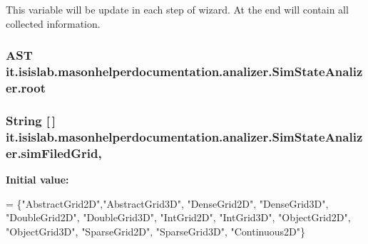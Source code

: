 This variable will be update in each step of wizard. At the end will contain all collected information. \hypertarget{classit_1_1isislab_1_1masonhelperdocumentation_1_1analizer_1_1_sim_state_analizer_acb0b59c4c3e5d2f326d75a95aaac7b5d}{
\subsubsection[{root}]{\setlength{\rightskip}{0pt plus 5cm}A\-S\-T it.\-isislab.\-masonhelperdocumentation.\-analizer.\-Sim\-State\-Analizer.\-root\hspace{0.3cm}{\ttfamily [private]}}}\label{classit_1_1isislab_1_1masonhelperdocumentation_1_1analizer_1_1_sim_state_analizer_acb0b59c4c3e5d2f326d75a95aaac7b5d}
\hypertarget{classit_1_1isislab_1_1masonhelperdocumentation_1_1analizer_1_1_sim_state_analizer_a558bb0807bb266f5ec5ef24c97b08c02}{
\subsubsection[{sim\-Filed\-Grid}]{\setlength{\rightskip}{0pt plus 5cm}String \mbox{[}$\,$\mbox{]} it.\-isislab.\-masonhelperdocumentation.\-analizer.\-Sim\-State\-Analizer.\-sim\-Filed\-Grid\hspace{0.3cm}{\ttfamily [static]}, {\ttfamily [private]}}}\label{classit_1_1isislab_1_1masonhelperdocumentation_1_1analizer_1_1_sim_state_analizer_a558bb0807bb266f5ec5ef24c97b08c02}
{\bfseries Initial value\-:}
\begin{DoxyCode}
= \{\textcolor{stringliteral}{"AbstractGrid2D"},\textcolor{stringliteral}{"AbstractGrid3D"}, \textcolor{stringliteral}{"DenseGrid2D"},
                                            \textcolor{stringliteral}{"DenseGrid3D"}, \textcolor{stringliteral}{"DoubleGrid2D"}, \textcolor{stringliteral}{"DoubleGrid3D"},
                                            \textcolor{stringliteral}{"IntGrid2D"}, \textcolor{stringliteral}{"IntGrid3D"}, \textcolor{stringliteral}{"ObjectGrid2D"}, \textcolor{stringliteral}{"ObjectGrid3D"},
                                            \textcolor{stringliteral}{"SparseGrid2D"}, \textcolor{stringliteral}{"SparseGrid3D"}, \textcolor{stringliteral}{"Continuous2D"}\}
\end{DoxyCode}

